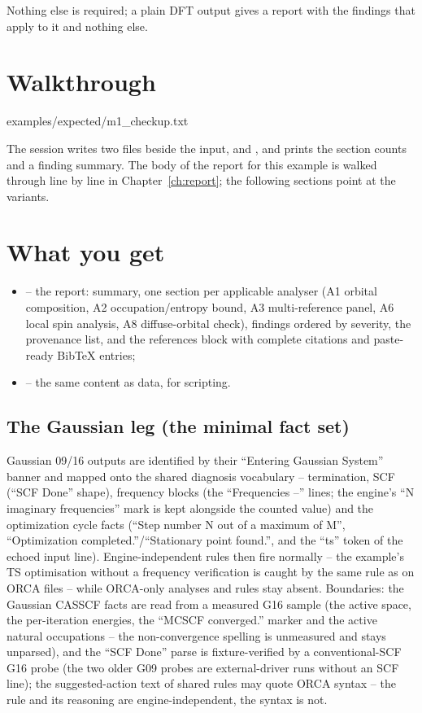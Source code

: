 Nothing else is required; a plain DFT output gives a report with the findings
that apply to it and nothing else.

\section{Walkthrough}


  {examples/expected/m1_checkup.txt}

The session writes two files beside the input,  and
, and prints the section counts and a finding summary. The
body of the report for this example is walked through line by line in
Chapter~\ref{ch:report}; the following sections point at the variants.

\section{What you get}

\begin{itemize}
  \item {} -- the report: summary, one section per applicable
    analyser (A1 orbital composition, A2 occupation/entropy bound, A3
    multi-reference panel, A6 local spin analysis, A8 diffuse-orbital check),
    findings ordered by severity, the provenance list, and the references block
    with complete citations and paste-ready BibTeX entries;
  \item {} -- the same content as data, for scripting.
\end{itemize}

\subsection*{The Gaussian leg (the minimal fact set)}

Gaussian 09/16 outputs are identified by their ``Entering Gaussian System''
banner and mapped onto the shared diagnosis vocabulary -- termination, SCF
(``SCF Done'' shape), frequency blocks (the ``Frequencies --'' lines; the
engine's ``N imaginary frequencies'' mark is kept alongside the counted
value) and the optimization cycle facts (``Step number N out of a maximum
of M'', ``Optimization completed.''/``Stationary point found.'', and the
``ts'' token of the echoed input line).  Engine-independent rules then fire
normally -- the example's TS optimisation without a frequency verification
is caught by the same rule as on ORCA files -- while ORCA-only analyses and
rules stay absent.  Boundaries: the Gaussian CASSCF facts are read from a
measured G16 sample (the active space, the per-iteration energies, the
``MCSCF converged.'' marker and the active natural occupations -- the
non-convergence spelling is unmeasured and stays unparsed), and the
``SCF Done'' parse is fixture-verified by a conventional-SCF G16 probe
(the two older G09 probes are external-driver runs without an SCF line);
the suggested-action text of shared rules may quote ORCA syntax -- the
rule and its reasoning are engine-independent, the syntax is not.

